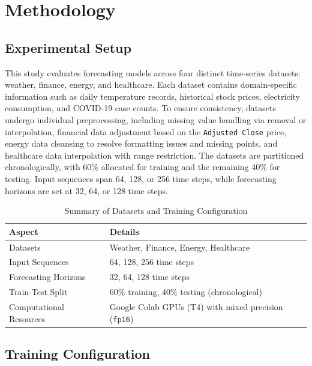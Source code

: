 \chapter{Methodology} \label{ch03:methodology}

\section{Experimental Setup}

This study evaluates forecasting models across four distinct time-series datasets: weather, finance, energy, and healthcare. Each dataset contains domain-specific information such as daily temperature records, historical stock prices, electricity consumption, and COVID-19 case counts. To ensure consistency, datasets undergo individual preprocessing, including missing value handling via removal or interpolation, financial data adjustment based on the \texttt{Adjusted Close} price, energy data cleansing to resolve formatting issues and missing points, and healthcare data interpolation with range restriction. The datasets are partitioned chronologically, with 60\% allocated for training and the remaining 40\% for testing. Input sequences span 64, 128, or 256 time steps, while forecasting horizons are set at 32, 64, or 128 time steps.

\begin{table}[ht]
\centering
\caption{Summary of Datasets and Training Configuration}
\begin{tabular}{|p{4cm}|p{8cm}|}
\hline
\textbf{Aspect} & \textbf{Details} \\
\hline
Datasets & Weather, Finance, Energy, Healthcare \\
\hline
Input Sequences & 64, 128, 256 time steps \\
\hline
Forecasting Horizons & 32, 64, 128 time steps \\
\hline
Train-Test Split & 60\% training, 40\% testing (chronological) \\
\hline
Computational Resources & Google Colab GPUs (T4) with mixed precision (\texttt{fp16}) \\
\hline
\end{tabular}
\label{tab:datasets_training}
\end{table}


\section{Training Configuration}


